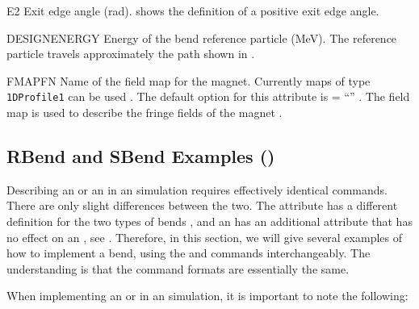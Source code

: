 \begin{kdescription}
\item[E2]
  Exit edge angle (\si{\radian}).  shows the definition of a positive exit edge angle.

\item[DESIGNENERGY]
  Energy of the bend reference particle (\si{\mega\electronvolt}). The reference particle travels approximately the path shown in
  .

\item[FMAPFN]
  Name of the field map for the magnet. Currently maps of type \texttt{1DProfile1} can
  be used . The default option for this attribute is  =
  ``'' . The field map is used to
  describe the fringe fields of the magnet .

\end{kdescription}

\clearpage

\subsection{RBend and SBend Examples (\opalt)}
\label{ssec:RBendSBendExamp}
Describing an  or an  in an \opalt simulation requires effectively identical commands.
There are only slight differences between the two. The  attribute has a different definition for the two
types of bends , and an  has an additional
attribute  that has no effect on an , see .
Therefore, in this section, we will give several examples of how to implement a bend, using the
 and  commands interchangeably. The understanding is that the command formats are
essentially the same.

When implementing an  or  in an \opalt simulation, it is important to note the following:

